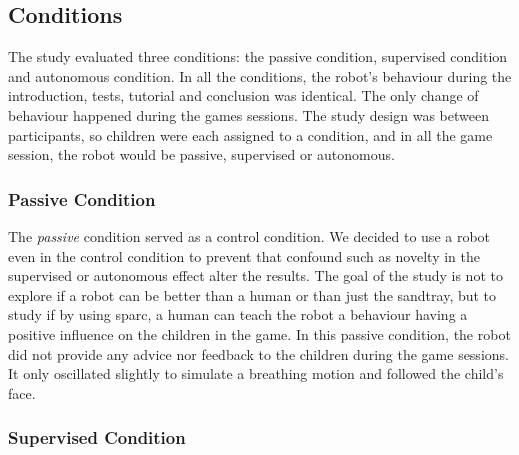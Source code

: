 
\subsection{Conditions}
The study evaluated three conditions: the passive condition, supervised condition and autonomous condition. In all the conditions, the robot's behaviour during the introduction, tests, tutorial and conclusion was identical. The only change of behaviour happened during the games sessions. The study design was between participants, so children were each assigned to a condition, and in all the game session, the robot would be passive, supervised or autonomous. %

\subsubsection{Passive Condition}

The \textit{passive} condition served as a control condition. We decided to use a robot even in the control condition to prevent that confound such as novelty in the supervised or autonomous effect alter the results. The goal of the study is not to explore if a robot can be better than a human or than just the sandtray, but to study if by using \gls{sparc}, a human can teach the robot a behaviour having a positive influence on the children in the game. In this passive condition, the robot did not provide any advice nor feedback to the children during the game sessions. It only oscillated slightly to simulate a breathing motion and followed the child's face. 




\subsubsection{Supervised Condition}

